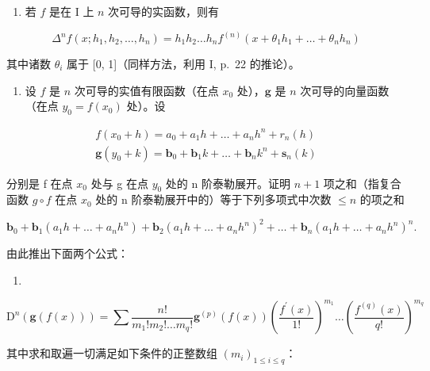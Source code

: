 \begin{enumerate}
\def\labelenumi{\alph{enumi})}
\setcounter{enumi}{2}
\tightlist
\item
  若 \(f\) 是在 I 上 \(n\) 次可导的实函数，则有
\end{enumerate}

\[
\Delta^ {n} f (x; h _ {1}, h _ {2}, \dots , h _ {n}) = h _ {1} h _ {2} \dots h _ {n} f ^ {(n)} (x + \theta_ {1} h _ {1} + \dots + \theta_ {n} h _ {n})
\]

其中诸数 \(\theta_{i}\) 属于 {[}0, 1{]}（同样方法，利用 I, p.~22 的推论）。

\begin{enumerate}
\def\labelenumi{\arabic{enumi})}
\setcounter{enumi}{6}
\tightlist
\item
  设 \(f\) 是 \(n\) 次可导的实值有限函数（在点 \(x_0\) 处），\(\mathbf{g}\) 是 \(n\) 次可导的向量函数（在点 \(y_0 = f(x_0)\) 处）。设
\end{enumerate}

\[
\begin{array}{l} f (x _ {0} + h) = a _ {0} + a _ {1} h + \dots + a _ {n} h ^ {n} + r _ {n} (h) \\ \mathbf {g} (y _ {0} + k) = \mathbf {b} _ {0} + \mathbf {b} _ {1} k + \dots + \mathbf {b} _ {n} k ^ {n} + \mathbf {s} _ {n} (k) \end{array}
\]

分别是 f 在点 \(x_{0}\) 处与 g 在点 \(y_{0}\) 处的 n 阶泰勒展开。证明 \(n+1\) 项之和（指复合函数 \(g \circ f\) 在点 \(x_{0}\) 处的 n 阶泰勒展开中的）等于下列多项式中次数 \(\leqslant n\) 的项之和

\[
\mathbf {b} _ {0} + \mathbf {b} _ {1} (a _ {1} h + \dots + a _ {n} h ^ {n}) + \mathbf {b} _ {2} (a _ {1} h + \dots + a _ {n} h ^ {n}) ^ {2} + \dots + \mathbf {b} _ {n} (a _ {1} h + \dots + a _ {n} h ^ {n}) ^ {n}.
\]

由此推出下面两个公式：

\begin{enumerate}
\def\labelenumi{\alph{enumi})}
\tightlist
\item
\end{enumerate}

\[
\mathrm{D} ^ {n} (\mathbf {g} (f (x))) = \sum \frac {n !}{m _ {1} ! m _ {2} ! \dots m _ {q} !} \mathbf {g} ^ {(p)} (f (x)) \left(\frac {f ^ {\prime} (x)}{1 !}\right) ^ {m _ {1}} \dots \left(\frac {f ^ {(q)} (x)}{q !}\right) ^ {m _ {q}}
\]

其中求和取遍一切满足如下条件的正整数组 \((m_{i})_{1\leqslant i\leqslant q}\)：


